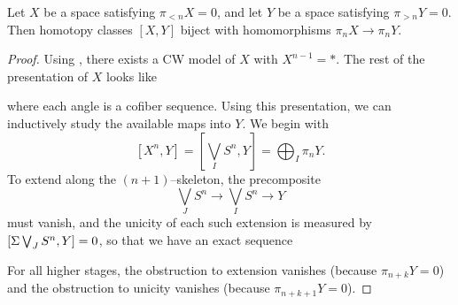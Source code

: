 \begin{lemma}\label{ConnToCoconnIsAlgebraic}%
Let $X$ be a space satisfying $\pi_{< n} X = 0$, and let $Y$ be a space satisfying $\pi_{> n} Y = 0$.
Then homotopy classes $[X, Y]$ biject with homomorphisms $\pi_n X \to \pi_n Y$.
\end{lemma}
\begin{proof}
Using , there exists a CW model of $X$ with $X^{n-1} = *$.
The rest of the presentation of $X$ looks like
\begin{center}
\end{center}
where each angle is a cofiber sequence.
Using this presentation, we can inductively study the available maps into $Y$.
We begin with \[[X^n, Y] = \left[\bigvee_I S^n, Y\right] = \bigoplus_I \pi_n Y.\]
To extend along the $(n+1)$--skeleton, the precomposite \[\bigvee_J S^n \to \bigvee_I S^n \to Y\] must vanish, and the unicity of each such extension is measured by $[\Sigma \bigvee_J S^n, Y] = 0$, so that we have an exact sequence
\begin{center}
\end{center}
For all higher stages, the obstruction to extension vanishes (because $\pi_{n+k} Y = 0$) and the obstruction to unicity vanishes (because $\pi_{n+k+1} Y = 0$).
\end{proof}

